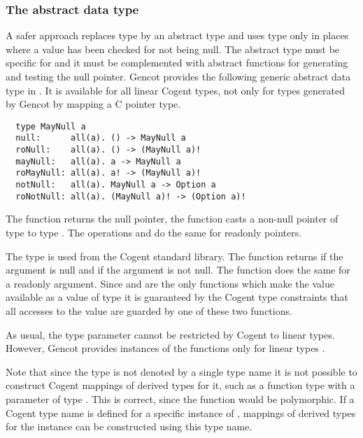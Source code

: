 \subsubsection{The abstract data type }

A safer approach replaces type  by an abstract type and uses type  only in places where a value has been checked
for not being null. The abstract type must be specific for  and it must be complemented with abstract functions for
generating and testing the null pointer. Gencot provides the following generic abstract data type in .
It is available for all linear Cogent types, not only for types generated by Gencot by mapping a C pointer type.
\begin{verbatim}
  type MayNull a 
  null:      all(a). () -> MayNull a
  roNull:    all(a). () -> (MayNull a)!
  mayNull:   all(a). a -> MayNull a
  roMayNull: all(a). a! -> (MayNull a)!
  notNull:   all(a). MayNull a -> Option a
  roNotNull: all(a). (MayNull a)! -> (Option a)!
\end{verbatim}
The function  returns the null pointer, the function  casts a non-null pointer of type 
to type . The operations  and  do the same for readonly pointers. 

The type  is used from the Cogent standard library. 
The function  returns  if the argument is null and  if the argument  is not null.
The function  does the same for a readonly argument. 
Since  and  are the only functions which make the value available as a value of type  
it is guaranteed by the Cogent type constraints that all accesses to the value are guarded by one of these two functions. 

As usual,
the type parameter  cannot be restricted by Cogent to linear types. However, Gencot provides instances of the functions only for
linear types .

Note that since the type  is not denoted by a single type name it is not possible to construct Cogent mappings of derived types for it, such
as a function type with a parameter of type . This is correct, since the function would be polymorphic. If a Cogent type name 
is defined for a specific instance of , mappings of derived types for the instance can be constructed using this type name.

